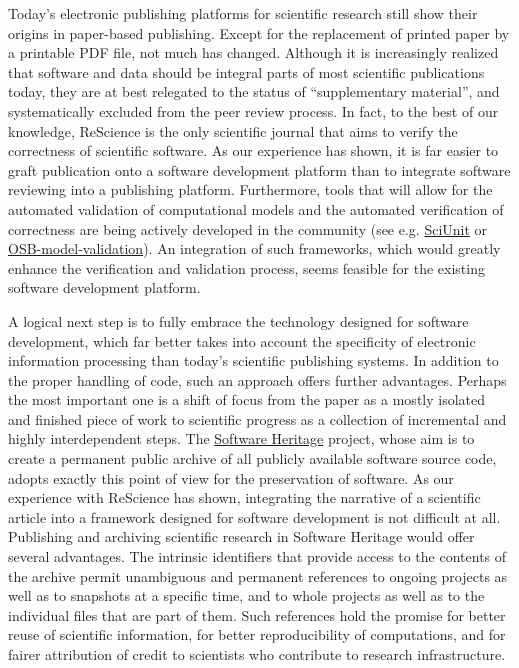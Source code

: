 \documentclass[a4paper,10pt, twocolumn]{article}
\begin{document}
Today's electronic publishing platforms for scientific research still
show their origins in paper-based publishing. Except for the
replacement of printed paper by a printable PDF file, not much has
changed. Although it is increasingly realized that software and data
should be integral parts of most scientific publications today, they
are at best relegated to the status of ``supplementary material'', and
systematically excluded from the peer review process. In fact, to the
best of our knowledge, ReScience is the only scientific journal that
aims to verify the correctness of scientific software. As our
experience has shown, it is far easier to graft publication onto a
software development platform than to integrate software reviewing
into a publishing platform. Furthermore, tools that will allow for the automated
validation of computational models and the automated verification of correctness are being actively 
developed in the community (see e.g. 
\href{https://github.com/scidash/sciunit}{SciUnit} or 
\href{https://github.com/OpenSourceBrain/osb-model-validation}{OSB-model-validation}). 
An integration of such frameworks, which would greatly enhance the 
verification and validation process, seems feasible for the existing software 
development platform.

A logical next step is to fully embrace the technology designed for
software development, which far better takes into account the
specificity of electronic information processing than today's
scientific publishing systems. In addition to the proper handling of
code, such an approach offers further advantages. Perhaps the most
important one is a shift of focus from the paper as a mostly isolated
and finished piece of work to scientific progress as a collection of
incremental and highly interdependent steps. The
\href{https://www.softwareheritage.org/}{Software Heritage} project,
whose aim is to create a permanent public archive of all publicly
available software source code, adopts exactly this point of view for
the preservation of software. As our experience with ReScience has
shown, integrating the narrative of a scientific article into a
framework designed for software development is not difficult at all.
Publishing and archiving scientific research in Software Heritage
would offer several advantages. The intrinsic identifiers that provide
access to the contents of the archive permit unambiguous and permanent
references to ongoing projects as well as to snapshots at a specific
time, and to whole projects as well as to the individual files that
are part of them. Such references hold the promise for better reuse of
scientific information, for better reproducibility of
computations, and for fairer attribution of credit to scientists
who contribute to research infrastructure.
\end{document}
